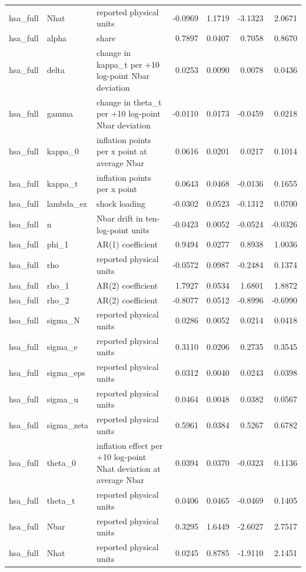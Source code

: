 \begin{tabular}{lllrrrr}
hsa\_full & Nhat & reported physical units & -0.0969 & 1.1719 & -3.1323 & 2.0671 \\
hsa\_full & alpha & share & 0.7897 & 0.0407 & 0.7058 & 0.8670 \\
hsa\_full & delta & change in kappa\_t per +10 log-point Nbar deviation & 0.0253 & 0.0090 & 0.0078 & 0.0436 \\
hsa\_full & gamma & change in theta\_t per +10 log-point Nbar deviation & -0.0110 & 0.0173 & -0.0459 & 0.0218 \\
hsa\_full & kappa\_0 & inflation points per x point at average Nbar & 0.0616 & 0.0201 & 0.0217 & 0.1014 \\
hsa\_full & kappa\_t & inflation points per x point & 0.0643 & 0.0468 & -0.0136 & 0.1655 \\
hsa\_full & lambda\_ez & shock loading & -0.0302 & 0.0523 & -0.1312 & 0.0700 \\
hsa\_full & n & Nbar drift in ten-log-point units & -0.0423 & 0.0052 & -0.0524 & -0.0326 \\
hsa\_full & phi\_1 & AR(1) coefficient & 0.9494 & 0.0277 & 0.8938 & 1.0036 \\
hsa\_full & rho & reported physical units & -0.0572 & 0.0987 & -0.2484 & 0.1374 \\
hsa\_full & rho\_1 & AR(2) coefficient & 1.7927 & 0.0534 & 1.6801 & 1.8872 \\
hsa\_full & rho\_2 & AR(2) coefficient & -0.8077 & 0.0512 & -0.8996 & -0.6990 \\
hsa\_full & sigma\_N & reported physical units & 0.0286 & 0.0052 & 0.0214 & 0.0418 \\
hsa\_full & sigma\_e & reported physical units & 0.3110 & 0.0206 & 0.2735 & 0.3545 \\
hsa\_full & sigma\_eps & reported physical units & 0.0312 & 0.0040 & 0.0243 & 0.0398 \\
hsa\_full & sigma\_u & reported physical units & 0.0464 & 0.0048 & 0.0382 & 0.0567 \\
hsa\_full & sigma\_zeta & reported physical units & 0.5961 & 0.0384 & 0.5267 & 0.6782 \\
hsa\_full & theta\_0 & inflation effect per +10 log-point Nhat deviation at average Nbar & 0.0394 & 0.0370 & -0.0323 & 0.1136 \\
hsa\_full & theta\_t & reported physical units & 0.0406 & 0.0465 & -0.0469 & 0.1405 \\
hsa\_full & Nbar & reported physical units & 0.3295 & 1.6449 & -2.6027 & 2.7517 \\
hsa\_full & Nhat & reported physical units & 0.0245 & 0.8785 & -1.9110 & 2.1451 \\

\end{tabular}
